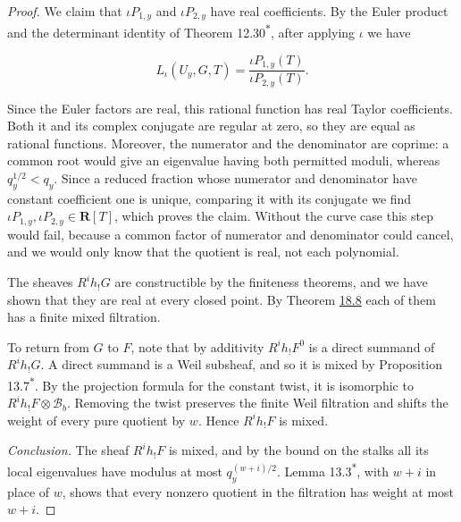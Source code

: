 \documentclass[11pt]{article}
\newcommand{\bpout}[1]{#1\textsuperscript{\hyperlink{bp-outside}{\ensuremath{\ast}}}}
\begin{document}
\begin{proof}[{Proof}]
We claim that \(\iota P_{1,y}\) and \(\iota P_{2,y}\) have real coefficients. By the Euler product and the determinant identity of Theorem \bpout{12.30}, after applying \(\iota\) we have

\[
L_\iota(U_y,G,T)=\frac{\iota P_{1,y}(T)}{\iota P_{2,y}(T)}.
\]

Since the Euler factors are real, this rational function has real Taylor coefficients. Both it and its complex conjugate are regular at zero, so they are equal as rational functions. Moreover, the numerator and the denominator are coprime: a common root would give an eigenvalue having both permitted moduli, whereas \(q_y^{1/2}<q_y\). Since a reduced fraction whose numerator and denominator have constant coefficient one is unique, comparing it with its conjugate we find \(\iota P_{1,y},\iota P_{2,y}\in\mathbf R[T]\), which proves the claim. Without the curve case this step would fail, because a common factor of numerator and denominator could cancel, and we would only know that the quotient is real, not each polynomial.

The sheaves \(R^ih_!G\) are constructible by the finiteness theorems, and we have shown that they are real at every closed point. By Theorem \hyperref[bp25]{18.8} each of them has a finite mixed filtration.

To return from \(G\) to \(F\), note that by additivity \(R^ih_!F^0\) is a direct summand of \(R^ih_!G\). A direct summand is a Weil subsheaf, and so it is mixed by Proposition \bpout{13.7}. By the projection formula for the constant twist, it is isomorphic to \(R^ih_!F\otimes\mathcal B_b\). Removing the twist preserves the finite Weil filtration and shifts the weight of every pure quotient by \(w\). Hence \(R^ih_!F\) is mixed.

\emph{Conclusion.} The sheaf \(R^ih_!F\) is mixed, and by the bound on the stalks all its local eigenvalues have modulus at most \(q_y^{(w+i)/2}\). Lemma \bpout{13.3}, with \(w+i\) in place of \(w\), shows that every nonzero quotient in the filtration has weight at most \(w+i\).
\end{proof}


\end{document}

